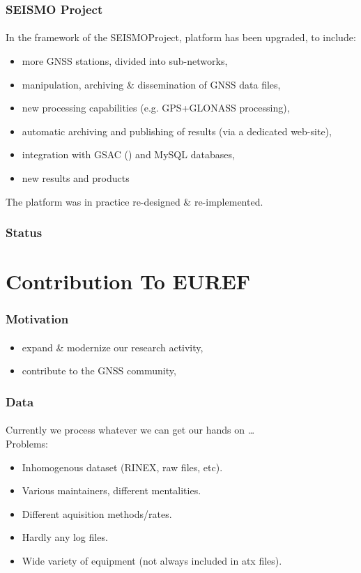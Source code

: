 \documentclass{beamer}
\begin{document}
\begin{frame}\frametitle{SEISMO Project}\framesubtitle{}
  In the framework of the SEISMO\footnotemark Project, platform has been upgraded,
  to include:

  \begin{itemize}
    \item more GNSS stations, divided into sub-networks,
    \item manipulation, archiving \& dissemination of GNSS data files,
    \item new processing capabilities (e.g. GPS+GLONASS processing),
    \item automatic archiving and publishing of results (via a dedicated web-site),
    \item integration with GSAC (\cite{gsac}) and MySQL databases,
    \item new results and products
  \end{itemize}

  The platform was in practice re-designed \& re-implemented.

\end{frame}

\begin{frame}\frametitle{Status}\framesubtitle{}
\end{frame}

\section{Contribution To EUREF}

\begin{frame}\frametitle{Motivation}\framesubtitle{}
  \begin{itemize}
    \item expand \& modernize our research activity,
    \item contribute to the GNSS community,
  \end{itemize}
\end{frame}

\begin{frame}\frametitle{Data}\framesubtitle{}
  Currently we process whatever we can get our hands on \ldots\\
  Problems:
  \begin{itemize}
    \item Inhomogenous dataset (RINEX, raw files, etc).
    \item Various maintainers, different mentalities.
    \item Different aquisition methods/rates.
    \item Hardly any log files.
    \item Wide variety of equipment (not always included in atx files).
  \end{itemize}
\end{frame}
\end{document}
